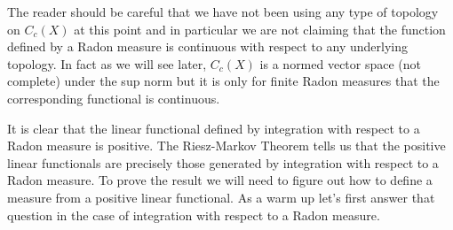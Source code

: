 The reader should be careful that we have not been using any type of
topology on $C_c(X)$ at this point and in particular we are not claiming
that the function defined by a Radon measure is continuous with respect to 
any underlying topology.  In fact as we will see later, $C_c(X)$ is a normed vector space 
(not complete) under the sup norm but it is only for finite Radon measures that the
corresponding functional is continuous.

It is clear that the linear functional defined by integration with
respect to a Radon measure is positive.  The Riesz-Markov Theorem
tells us that the positive linear functionals are precisely those
generated by integration with respect to a Radon measure.  To prove
the result we will need to figure out how to define a measure from a
positive linear functional.  As a warm up let's first answer that
question in the case of integration with respect to a Radon measure.

